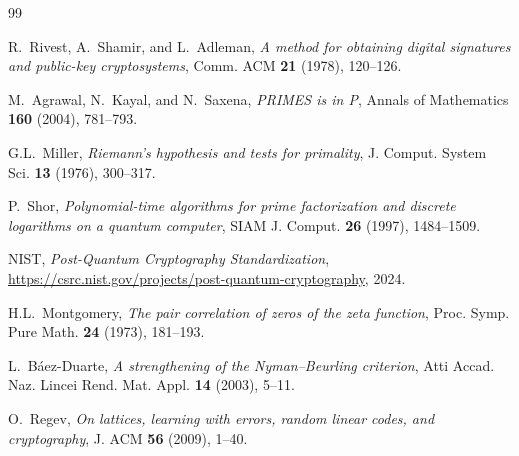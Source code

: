 \documentclass[11pt,a4paper]{article}
\begin{document}
\vspace{1cm}

\begin{thebibliography}{99}

R.~Rivest, A.~Shamir, and L.~Adleman, \emph{A method for obtaining
digital signatures and public-key cryptosystems}, Comm. ACM
\textbf{21} (1978), 120--126.

M.~Agrawal, N.~Kayal, and N.~Saxena, \emph{PRIMES is in P},
Annals of Mathematics \textbf{160} (2004), 781--793.

G.L.~Miller, \emph{Riemann's hypothesis and tests for primality},
J. Comput. System Sci. \textbf{13} (1976), 300--317.

P.~Shor, \emph{Polynomial-time algorithms for prime factorization
and discrete logarithms on a quantum computer}, SIAM J. Comput.
\textbf{26} (1997), 1484--1509.

NIST, \emph{Post-Quantum Cryptography Standardization},
\url{https://csrc.nist.gov/projects/post-quantum-cryptography}, 2024.

H.L.~Montgomery, \emph{The pair correlation of zeros of the zeta
function}, Proc. Symp. Pure Math. \textbf{24} (1973), 181--193.

L.~B\'aez-Duarte, \emph{A strengthening of the Nyman--Beurling
criterion}, Atti Accad. Naz. Lincei Rend. Mat. Appl. \textbf{14}
(2003), 5--11.

O.~Regev, \emph{On lattices, learning with errors, random linear
codes, and cryptography}, J. ACM \textbf{56} (2009), 1--40.

\end{thebibliography}
\end{document}
